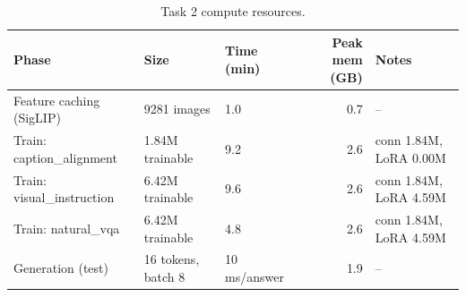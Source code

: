 \begin{table}[t]
\centering
\scriptsize
\begin{tabular}{lllrl}
\toprule
Phase & Size & Time (min) & Peak mem (GB) & Notes \\
\midrule
Feature caching (SigLIP) & 9281 images & 1.0 & 0.7 & -- \\
Train: caption_alignment & 1.84M trainable & 9.2 & 2.6 & conn 1.84M, LoRA 0.00M \\
Train: visual_instruction & 6.42M trainable & 9.6 & 2.6 & conn 1.84M, LoRA 4.59M \\
Train: natural_vqa & 6.42M trainable & 4.8 & 2.6 & conn 1.84M, LoRA 4.59M \\
Generation (test) & 16 tokens, batch 8 & 10 ms/answer & 1.9 & -- \\
\bottomrule
\end{tabular}
\caption{Task 2 compute resources.}
\label{tab:t2-res}
\end{table}
